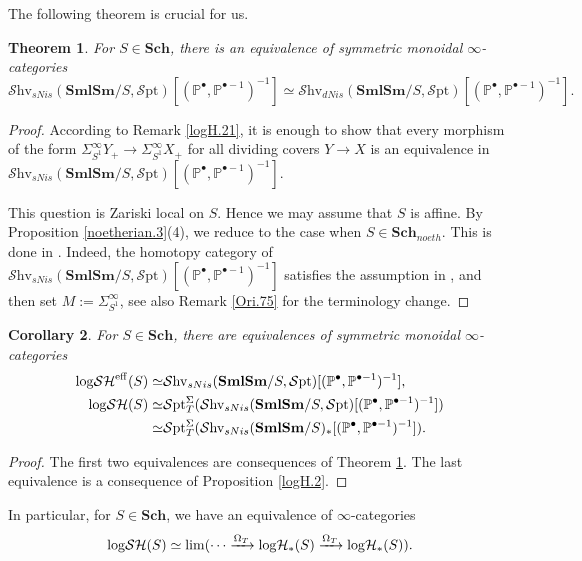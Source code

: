 \documentclass[11pt, a4paper]{amsart}
\newtheorem{thm}{Theorem}[subsection]
\newtheorem{cor}[thm]{Corollary}
\theoremstyle{definition}
\numberwithin{equation}{subsection}
\renewcommand{\P}{\mathbb{P}}
\newcommand{\Sch}{\mathbf{Sch}}
\newcommand{\SmlSm}{\mathbf{SmlSm}}
\newcommand{\limit}{\mathop{\rm lim}}
\newcommand{\eff}{{\rm eff}}
\newcommand{\infShv}{\mathcal{S}\mathrm{hv}}
\newcommand{\infSpt}{\mathcal{S}\mathrm{pt}}
\newcommand{\inflogHpt}{\mathrm{log}\mathcal{H}_\ast}
\newcommand{\inflogSH}{\mathrm{log}\mathcal{SH}}
\begin{document}
The following theorem is crucial for us.


\begin{thm}
\label{logSH.15}
For $S\in \Sch$, there is an equivalence of symmetric monoidal $\infty$-categories 
\[
\infShv_{sNis}(\SmlSm/S, \infSpt)
[(\P^\bullet,\P^{\bullet-1})^{-1}]
\simeq
\infShv_{dNis}(\SmlSm/S, \infSpt)
[(\P^\bullet,\P^{\bullet-1})^{-1}].
\]
\end{thm}
\begin{proof}
According to Remark \ref{logH.21}, it is enough to show that every morphism of the form
$
\Sigma_{S^1}^\infty Y_+
\to
\Sigma_{S^1}^\infty X_+
$
for all dividing covers $Y\to X$ is an equivalence in $\infShv_{sNis}(\SmlSm/S, \infSpt)
[(\P^\bullet,\P^{\bullet-1})^{-1}]$.

This question is Zariski local on $S$.
Hence we may assume that $S$ is affine.
By Proposition \ref{noetherian.3}(4),
we reduce to the case when $S\in \Sch_{noeth}$.
This is done in
\cite[Theorem 7.7.4]{logDM}.
Indeed, the homotopy category of $\infShv_{sNis}(\SmlSm/S, \infSpt)
[(\P^\bullet,\P^{\bullet-1})^{-1}]$ satisfies the assumption in \cite[\S 7.7]{logDM}, and then set $M:=\Sigma_{S^1}^\infty$,
see also Remark \ref{Ori.75} for the terminology change.
\end{proof}


\begin{cor}\label{cor:fundamental_models}
For $S\in \Sch$,
there are equivalences of symmetric monoidal $\infty$-categories
  \begin{align*}
 \inflogSH^\eff(S)
 \simeq &
\infShv_{sNis}(\SmlSm/S,\infSpt)
[(\P^\bullet,\P^{\bullet-1})^{-1}],
\\
 \inflogSH(S) \simeq &\infSpt^\Sigma_{T}(\infShv_{sNis}(\SmlSm/S, \infSpt)
[(\P^\bullet,\P^{\bullet-1})^{-1}])
\\
\simeq & \infSpt^\Sigma_{T}(\infShv_{sNis}(\SmlSm/S)_\ast
[(\P^\bullet,\P^{\bullet-1})^{-1}]).
 \end{align*}
\end{cor}
\begin{proof}
The first two equivalences are consequences of Theorem \ref{logSH.15}.
The last equivalence is a consequence of Proposition \ref{logH.2}.
\end{proof}


In particular,
for $S\in \Sch$,
we have an equivalence of $\infty$-categories
\begin{equation}
\label{alter.1.5}
\inflogSH(S)
\simeq
\limit(\cdots \xrightarrow{\Omega_T}\inflogHpt(S)\xrightarrow{\Omega_T}\inflogHpt(S)).
\end{equation}
\end{document}
